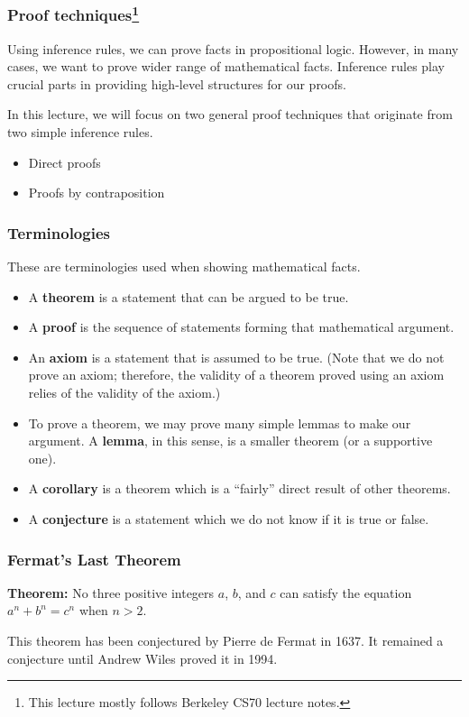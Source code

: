 

\begin{frame}\frametitle{Proof techniques\footnote{This lecture mostly follows Berkeley CS70 lecture notes.}}
  Using inference rules, we can prove facts in propositional logic.
  However, in many cases, we want to prove wider range of mathematical
  facts.  Inference rules play crucial parts in providing high-level
  structures for our proofs. \pause

  In this lecture, we will focus on two general proof techniques that
  originate from two simple inference rules.
  \begin{itemize}
  \item Direct proofs
  \item Proofs by contraposition
  \end{itemize}
\end{frame}

\begin{frame}\frametitle{Terminologies}
  These are terminologies used when showing mathematical facts.
  \begin{itemize}
  \item A {\bf theorem} is a statement that can be argued to be true.
  \item A {\bf proof} is the sequence of statements forming that
    mathematical argument.
    \pause
  \item An {\bf axiom} is a statement that is assumed to be true.
    (Note that we do not prove an axiom; therefore, the validity of a
    theorem proved using an axiom relies of the validity of the
    axiom.)
    \pause
  \item To prove a theorem, we may prove many simple lemmas to make
    our argument.  A {\bf lemma}, in this sense, is a smaller theorem
    (or a supportive one).
    \pause
  \item A {\bf corollary} is a theorem which is a ``fairly'' direct
    result of other theorems.
    \pause
  \item A {\bf conjecture} is a statement which we do not know if it
    is true or false.
  \end{itemize}
\end{frame}

\begin{frame}\frametitle{Fermat's Last Theorem}
  \begin{tcolorbox}
    {\bf Theorem:} No three positive integers $a$, $b$, and $c$ can satisfy the equation $a^n+b^n=c^n$ when $n>2$.
  \end{tcolorbox}

  This theorem has been conjectured by Pierre de Fermat in 1637.  It
  remained a conjecture until Andrew Wiles proved it in 1994.
\end{frame}

